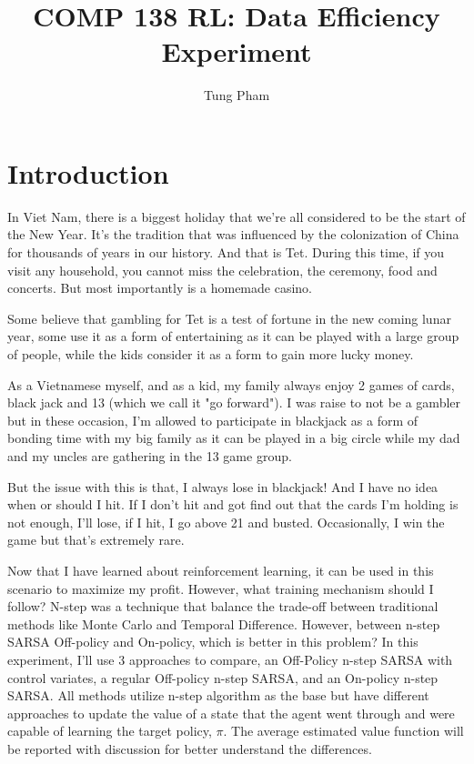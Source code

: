 \documentclass{article}
\title{COMP 138 RL: Data Efficiency Experiment}
\author{Tung Pham}
\begin{document}
\maketitle

\section{Introduction}
In Viet Nam, there is a biggest holiday that we're all considered to be the
start of the New Year. It's the tradition that was influenced by the
colonization of China for thousands of years in our history. And that is Tet.
During this time, if you visit any household, you cannot miss the celebration,
the ceremony, food and concerts. But most importantly is a homemade casino.

Some believe that gambling for Tet is a test of fortune in the new coming lunar
year, some use it as a form of entertaining as it can be played with a large
group of people, while the kids consider it as a form to gain more lucky money.

As a Vietnamese myself, and as a kid, my family always enjoy 2 games of cards,
black jack and 13 (which we call it "go forward"). I was raise to not be a
gambler but in these occasion, I'm allowed to participate in blackjack as a form
of bonding time with my big family as it can be played in a big circle while my
dad and my uncles are gathering in the 13 game group.

But the issue with this is that, I always lose in blackjack! And I have no idea when or
should I hit. If I don't hit and got find out that the cards I'm holding is not
enough, I'll lose, if I hit, I go above 21 and busted. Occasionally, I win the game but
that's extremely rare.

Now that I have learned about reinforcement learning, it can be used
in this scenario to maximize my profit. However, what training mechanism should I follow?
N-step was a technique that balance the trade-off between traditional methods
like Monte Carlo and Temporal Difference. However, between n-step SARSA Off-policy and On-policy,
which is better in this problem?
In this experiment, I'll use 3 approaches to compare, an Off-Policy n-step SARSA with
control variates, a regular Off-policy n-step SARSA, and an On-policy n-step
SARSA. All methods utilize n-step algorithm as the base but have different
approaches to update the value of a state that the agent went through and were
capable of learning the target policy, $\pi$. The average estimated value
function will be reported with discussion for better understand the differences.
\end{document}
